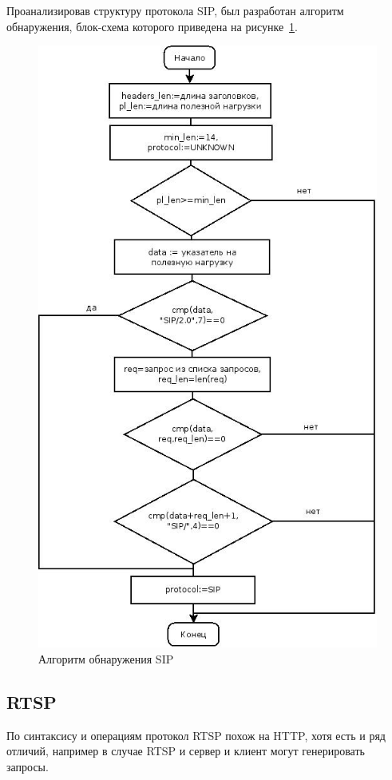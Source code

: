Проанализировав структуру протокола SIP, был разработан алгоритм обнаружения, блок-схема которого приведена на рисунке~\ref{pic:sip_alg}.
\begin{figure}
\centering
\includegraphics[scale=0.6]{pictures/sip_alg}
\caption{Алгоритм обнаружения SIP}
\label{pic:sip_alg}
\end{figure}

\subsection{RTSP}
По синтаксису и операциям протокол RTSP похож на HTTP, хотя есть и ряд отличий, например в случае RTSP и сервер и клиент могут генерировать запросы.

